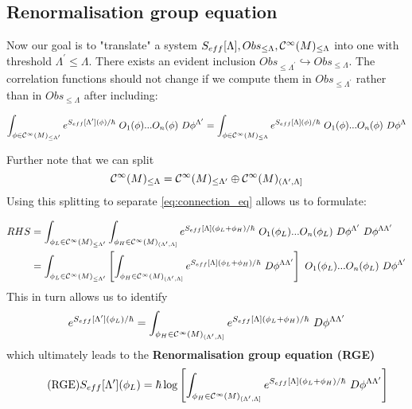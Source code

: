 \subsection{Renormalisation group equation}
\label{subsec:renorm_group_eq}

Now our goal is to "translate" a system $S_{eff}[\Lambda], Obs_{\leq \Lambda}, \mathcal{C}^{\infty}(M)_{\leq \Lambda}$ into one with threshold $\Lambda^\prime \leq \Lambda$. There exists an evident inclusion $Obs_{\leq \Lambda^\prime} \hookrightarrow Obs_{\leq \Lambda}$. The correlation functions should not change if we compute them in $Obs_{\leq \Lambda^\prime}$ rather than in $Obs_{\leq \Lambda}$ after including:

\begin{align}
\label{eq:connection_eq}
  \int_{\phi \in \Ci(M)_{\leq \Lambda^\prime}} e^{S_{eff}[\Lambda^\prime] (\phi) / \hbar} \ O_1(\phi) ... O_n(\phi) \ D\phi^{\Lambda^\prime} = \int_{\phi \in \Ci(M)_{\leq \Lambda}} e^{S_{eff}[\Lambda] (\phi) / \hbar} \ O_1(\phi) ... O_n(\phi) \ D\phi^{\Lambda}
\end{align}

Further note that we can split
\begin{equation} \mathcal{C}^{\infty}(M)_{\leq \Lambda} = \mathcal{C}^{\infty}(M)_{\leq \Lambda^\prime} \oplus \mathcal{C}^{\infty}(M)_{(\Lambda^\prime,\Lambda]}\end{equation}
Using this splitting to separate \eqref{eq:connection_eq} allows us to formulate:

\begin{align}
  RHS &= \int_{\phi_L \in \Ci(M)_{\leq \Lambda^\prime}}
  \int_{\phi_H \in \Ci(M)_{(\Lambda^\prime,\Lambda]}}
  e^{S_{eff}[\Lambda] (\phi_L + \phi_H) / \hbar} \ O_1(\phi_L) ... O_n(\phi_L) \ D\phi^{\Lambda^\prime} \ D\phi^{\Lambda \Lambda^\prime} \\
  &= \int_{\phi_L \in \Ci(M)_{\leq \Lambda^\prime}}
  \left [\int_{\phi_H \in \Ci(M)_{(\Lambda^\prime,\Lambda]}}
  e^{S_{eff}[\Lambda] (\phi_L + \phi_H) / \hbar} \ D\phi^{\Lambda \Lambda^\prime} \right] \ O_1(\phi_L) ... O_n(\phi_L) \ D\phi^{\Lambda^\prime} \\
\end{align}
This in turn allows us to identify
\begin{equation} e^{S_{eff}[\Lambda^\prime](\phi_L)/\hbar}
= \int_{\phi_H \in \Ci(M)_{(\Lambda^\prime,\Lambda]}}
e^{S_{eff}[\Lambda] (\phi_L + \phi_H) / \hbar} \ D\phi^{\Lambda \Lambda^\prime}\end{equation}
which ultimately leads to the \textbf{Renormalisation group equation (RGE)}
\begin{align}
\label{eq:RGE}\tag{RGE}
  S_{eff}[\Lambda^\prime](\phi_L)
  = \hbar \log \left[ \int_{\phi_H \in \Ci(M)_{(\Lambda^\prime,\Lambda]}}
  e^{S_{eff}[\Lambda] (\phi_L + \phi_H) / \hbar} \ D\phi^{\Lambda \Lambda^\prime} \right]
\end{align}

